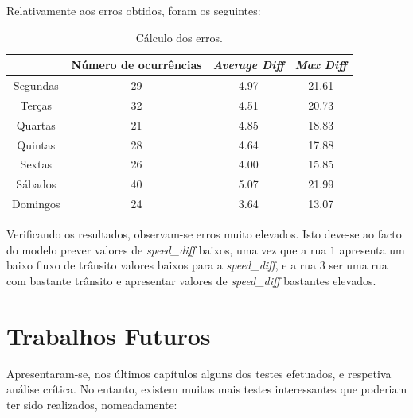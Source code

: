 \documentclass[a4paper, 12pt]{article}
\begin{document}
Relativamente aos erros obtidos, foram os seguintes:

\begin{table}[H]
	\centering
	\begin{tabular}{||c||c|c|c||}
		\hline\hline
		& Número de ocurrências &\textit{Average Diff} & \textit{Max Diff} \\
		\hline\hline
		 Segundas &29 & 4.97
		& 21.61 \\
		\hline
		 Terças  &32&
		4.51
		& 20.73\\
		\hline
		 Quartas & 21&4.85
		
		& 18.83	\\
		\hline
		 Quintas  & 28&
		4.64
		&	17.88\\
		\hline
		 Sextas & 26&
		4.00 & 15.85 \\
		\hline
		 Sábados  &40& 5.07
		& 21.99 \\
		\hline
		 Domingos & 24&
		3.64
		& 13.07
		
		\\
		\hline\hline
	\end{tabular}
	\label{table:mod1_rua3}
	\caption{Cálculo dos erros.}
\end{table}

Verificando os resultados, observam-se erros muito elevados. Isto deve-se ao facto do modelo prever valores de \textit{speed\_diff} baixos, uma vez que a rua $1$ apresenta um baixo fluxo de trânsito valores baixos para a \textit{speed\_diff}, e a rua $3$ ser uma rua com bastante trânsito e apresentar valores de \textit{speed\_diff} bastantes elevados.

\section{Trabalhos Futuros}

Apresentaram-se, nos últimos capítulos alguns dos testes efetuados, e respetiva análise crítica. No entanto, existem muitos mais testes interessantes que poderiam ter sido realizados, nomeadamente:
\end{document}
